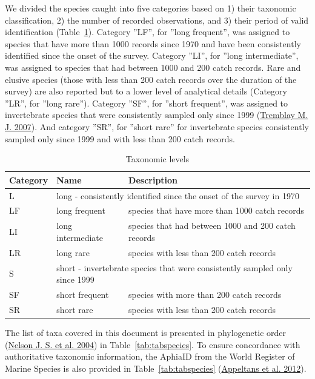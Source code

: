 \documentclass[12pt]{article}\usepackage[]{graphicx}\usepackage[]{color}
\begin{document}
We divided the species caught into five categories based on 1) their taxonomic classification, 2) the number of recorded observations, and 3) their period of valid identification (Table~\ref{tab:taxocat}). Category ''LF'', for ''long frequent'', was assigned to species that have more than 1000 records since 1970 and have been consistently identified since the onset of the survey. Category ''LI'', for ''long intermediate'', was assigned to species that had between 1000 and 200 catch records. Rare and elusive species (those with less than 200 catch records over the duration of the survey) are also reported but to a lower level of analytical details (Category ''LR'', for ''long rare''). Category ''SF'', for ''short frequent'', was assigned to invertebrate species that were consistently sampled only since 1999 (\protect\hyperlink{ref-Tremblayetal:2007}{Tremblay M. J. 2007}). And category ''SR'', for ''short rare'' for invertebrate species consistently sampled only since 1999 and with less than 200 catch records.
\begin{table}
\begin{tabular}{p{}p{}p{}}
\toprule
\bfseries{Category} & \bfseries{Name} & \bfseries{Description} \\
\midrule
L & \multicolumn{2}{l}{long - consistently identified since the onset of the survey in 1970}\\
\midrule
LF & long frequent & species that have more than 1000 catch records \\

LI & long intermediate & species that had between 1000 and 200 catch records\\

LR & long rare & species with less than 200 catch records\\
\midrule
S & \multicolumn{2}{l}{short - invertebrate species that were consistently sampled only since 1999}\\
\midrule
SF & short frequent & species with more than 200 catch records \\

SR & short rare & species with less than 200 catch records\\
\bottomrule
\end{tabular}
\caption{Taxonomic levels}
\label{tab:taxocat}
\end{table}
The list of taxa covered in this document is presented in phylogenetic order (\protect\hyperlink{ref-Nelsonetal:2004}{Nelson J. S. et al. 2004}) in Table~\ref{tab:tabspecies}. To ensure concordance with authoritative taxonomic information, the AphiaID from the World Register of Marine Species is also provided in Table~\ref{tab:tabspecies} (\protect\hyperlink{ref-WoRMS}{Appeltans et al. 2012}).
\end{document}
